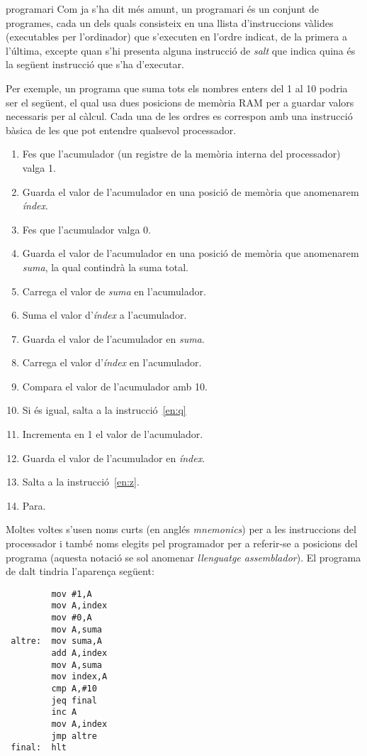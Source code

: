 \begin{persabermes}{programari}
  Com ja s'ha dit més amunt, un programari és un conjunt de programes,
  cada un dels quals consisteix en una llista d'instruccions vàlides
  (executables per l'ordinador) que s'executen en l'ordre indicat, de
  la primera a l'última, excepte quan s'hi presenta alguna instrucció
  de \emph{salt} que indica quina és la següent instrucció que s'ha
  d'executar.

  Per exemple, un programa que suma tots els nombres enters del 1 al 10
  podria ser el següent, el qual usa dues posicions de memòria RAM per a
  guardar valors necessaris per al càlcul. Cada una de les ordres es
  correspon amb una instrucció bàsica de les que pot entendre qualsevol
  processador.
  \begin{enumerate}
  \item Fes que l'acumulador (un registre de la memòria interna del
    processador) valga 1.
  \item Guarda el valor de l'acumulador en una posició de memòria que
    anomenarem \emph{índex}.
  \item Fes que l'acumulador valga 0.
  \item Guarda el valor de l'acumulador en una posició de memòria que
    anomenarem \emph{suma}, la qual contindrà la suma total.
  \item \label{en:z} Carrega el valor de \emph{suma} en l'acumulador.
  \item Suma el valor d'\emph{índex} a l'acumulador.
  \item Guarda el valor de l'acumulador en \emph{suma}.
  \item Carrega el valor d'\emph{índex} en l'acumulador.
  \item Compara el valor de l'acumulador amb 10.
  \item Si és igual, salta a la instrucció~\ref{en:q}
  \item Incrementa en 1 el valor de l'acumulador.
  \item Guarda el valor de l'acumulador en \emph{índex}.
  \item Salta a la instrucció~\ref{en:z}.
  \item \label{en:q} Para.
  \end{enumerate}

  Moltes voltes s'usen noms curts (en anglés \emph{mnemonics}) per a les
  instruccions del processador i també noms elegits pel programador per
  a referir-se a posicions del programa (aquesta notació se sol anomenar
  \emph{llenguatge assemblador}). El programa de dalt tindria l'aparença
  següent:
\begin{verbatim}
         mov #1,A
         mov A,index
         mov #0,A
         mov A,suma
 altre:  mov suma,A
         add A,index
         mov A,suma
         mov index,A
         cmp A,#10
         jeq final
         inc A
         mov A,index
         jmp altre
 final:  hlt
\end{verbatim}


\end{persabermes}
